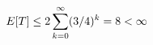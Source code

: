 \documentclass[preview]{standalone}
\begin{document}
\begin{align*}
\special{dvisvgm:raw <g id='unique000'>}E[T]\le2\sum_{k=0}^{\infty}(3/4)^k=8<\infty\special{dvisvgm:raw </g>}
\end{align*}
\end{document}
